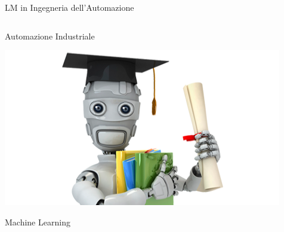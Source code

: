 \documentclass{beamer}
\begin{document}
\begin{frame}{LM in Ingegneria dell'Automazione}
\begin{columns}
\begin{column}{0.4\textwidth}
				Automazione Industriale

				\vspace{1cm}
				\includegraphics[width=\textwidth]{large-icon.png}

				Machine Learning
			\end{column}
		\end{columns}
	\end{frame}
\end{document}
